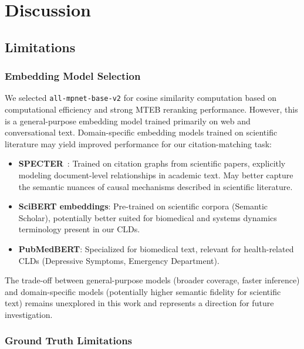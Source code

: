 \section{Discussion}
\label{sec:discussion}

\subsection{Limitations}

\subsubsection{Embedding Model Selection}

We selected \texttt{all-mpnet-base-v2} for cosine similarity computation based on computational efficiency and strong MTEB reranking performance. However, this is a general-purpose embedding model trained primarily on web and conversational text. Domain-specific embedding models trained on scientific literature may yield improved performance for our citation-matching task:

\begin{itemize}[noitemsep]
    \item \textbf{SPECTER}~\cite{cohan2020specter}: Trained on citation graphs from scientific papers, explicitly modeling document-level relationships in academic text. May better capture the semantic nuances of causal mechanisms described in scientific literature.
    \item \textbf{SciBERT embeddings}: Pre-trained on scientific corpora (Semantic Scholar), potentially better suited for biomedical and systems dynamics terminology present in our CLDs.
    \item \textbf{PubMedBERT}: Specialized for biomedical text, relevant for health-related CLDs (Depressive Symptoms, Emergency Department).
\end{itemize}

The trade-off between general-purpose models (broader coverage, faster inference) and domain-specific models (potentially higher semantic fidelity for scientific text) remains unexplored in this work and represents a direction for future investigation.

\subsubsection{Ground Truth Limitations}

